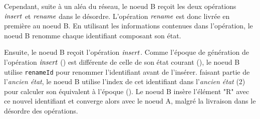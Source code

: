 Cependant, suite à un aléa du réseau, le noeud B reçoit les deux opérations $\mathit{insert}$ et $\mathit{rename}$ dans le désordre.
L'opération $\mathit{rename}$ est donc livrée en première au noeud B.
En utilisant les informations contenues dans l'opération, le noeud B renomme chaque identifiant composant son état.

Ensuite, le noeud B reçoit l'opération $\mathit{insert}$.
Comme l'époque de génération de l'opération $\mathit{insert}$ () est différente de celle de son état courant (), le noeud B utilise \texttt{renameId} pour renommer l'identifiant avant de l'insérer.
 faisant partie de l'\emph{ancien état}, le noeud B utilise l'index de cet identifiant dans l'\emph{ancien état} (2) pour calculer son équivalent à l'époque  ().
Le noeud B insère l'élément "R" avec ce nouvel identifiant et converge alors avec le noeud A, malgré la livraison dans le désordre des opérations.
